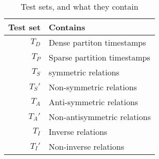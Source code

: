 \begin{table}[htb]
\centering
\begin{minipage}{0.95\columnwidth}
\centering
\caption{Test sets, and what they contain}
\vspace{-3mm}

\begin{tabular}{r|l}\hline
Test set & Contains \\ \hline
$T_D$ & Dense partiton timestamps \\ 
$T_P$ & Sparse partition timestamps \\
$T_S$ & symmetric relations \\ 
$T_S'$ & Non-symmetric relations \\ 
$T_A$ & Anti-symmetric relations \\ 
$T_A'$ & Non-antisymmetric relations \\ 
$T_I$ & Inverse relations \\ 
$T_I'$ & Non-inverse relations \\ \hline
\end{tabular}

\label{tab:test_set_explanations}
\end{minipage}
\end{table}

